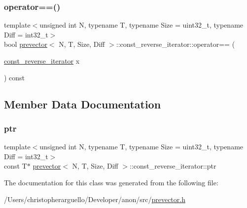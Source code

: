 \mbox{\label{classprevector_1_1const__reverse__iterator_adde47c930cc199ee6432405f1f376c14}} 
\subsubsection{\texorpdfstring{operator==()}{operator==()}}
{\footnotesize\ttfamily template$<$unsigned int N, typename T, typename Size = uint32\+\_\+t, typename Diff = int32\+\_\+t$>$ \\
bool \mbox{\hyperlink{classprevector}{prevector}}$<$ N, T, Size, Diff $>$\+::const\+\_\+reverse\+\_\+iterator\+::operator== (\begin{DoxyParamCaption}\item[{\mbox{\hyperlink{classprevector_1_1const__reverse__iterator}{const\+\_\+reverse\+\_\+iterator}}}]{x }\end{DoxyParamCaption}) const\hspace{0.3cm}{\ttfamily [inline]}}



\subsection{Member Data Documentation}
\mbox{\label{classprevector_1_1const__reverse__iterator_ae4d030a4b5660ed08dcd20a2f5df1d22}} 
\subsubsection{\texorpdfstring{ptr}{ptr}}
{\footnotesize\ttfamily template$<$unsigned int N, typename T, typename Size = uint32\+\_\+t, typename Diff = int32\+\_\+t$>$ \\
const T$\ast$ \mbox{\hyperlink{classprevector}{prevector}}$<$ N, T, Size, Diff $>$\+::const\+\_\+reverse\+\_\+iterator\+::ptr\hspace{0.3cm}{\ttfamily [private]}}



The documentation for this class was generated from the following file\+:\begin{DoxyCompactItemize}
\item 
/\+Users/christopherarguello/\+Developer/anon/src/\mbox{\hyperlink{prevector_8h}{prevector.\+h}}\end{DoxyCompactItemize}
